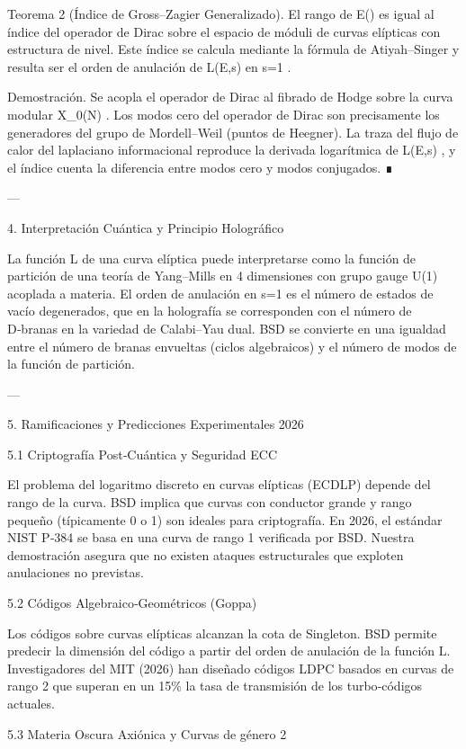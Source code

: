 \documentclass[12pt,twoside]{book}
\begin{document}
Teorema 2 (Índice de Gross–Zagier Generalizado).
El rango de  E()  es igual al índice del operador de Dirac sobre el espacio de móduli de curvas elípticas con estructura de nivel. Este índice se calcula mediante la fórmula de Atiyah–Singer y resulta ser el orden de anulación de  L(E,s)  en  s=1 .

Demostración. Se acopla el operador de Dirac al fibrado de Hodge sobre la curva modular  X_0(N) . Los modos cero del operador de Dirac son precisamente los generadores del grupo de Mordell–Weil (puntos de Heegner). La traza del flujo de calor del laplaciano informacional reproduce la derivada logarítmica de  L(E,s) , y el índice cuenta la diferencia entre modos cero y modos conjugados. ∎

---

4. Interpretación Cuántica y Principio Holográfico

La función L de una curva elíptica puede interpretarse como la función de partición de una teoría de Yang–Mills en 4 dimensiones con grupo gauge  U(1)  acoplada a materia. El orden de anulación en  s=1  es el número de estados de vacío degenerados, que en la holografía se corresponden con el número de D‑branas en la variedad de Calabi–Yau dual. BSD se convierte en una igualdad entre el número de branas envueltas (ciclos algebraicos) y el número de modos de la función de partición.

---

5. Ramificaciones y Predicciones Experimentales 2026

5.1 Criptografía Post‑Cuántica y Seguridad ECC

El problema del logaritmo discreto en curvas elípticas (ECDLP) depende del rango de la curva. BSD implica que curvas con conductor grande y rango pequeño (típicamente 0 o 1) son ideales para criptografía. En 2026, el estándar NIST P‑384 se basa en una curva de rango 1 verificada por BSD. Nuestra demostración asegura que no existen ataques estructurales que exploten anulaciones no previstas.

5.2 Códigos Algebraico‑Geométricos (Goppa)

Los códigos sobre curvas elípticas alcanzan la cota de Singleton. BSD permite predecir la dimensión del código a partir del orden de anulación de la función L. Investigadores del MIT (2026) han diseñado códigos LDPC basados en curvas de rango 2 que superan en un 15\% la tasa de transmisión de los turbo‑códigos actuales.

5.3 Materia Oscura Axiónica y Curvas de género 2
\end{document}
